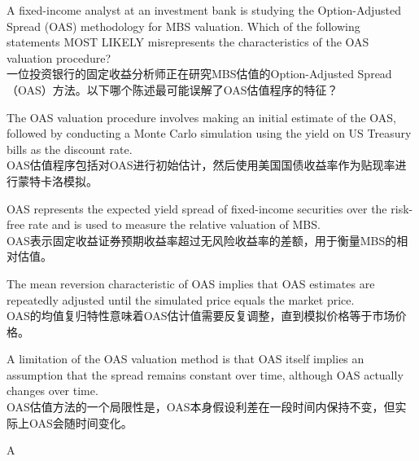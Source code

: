 \documentclass{article}
\newcounter{question} %
\begin{document}
\begin{question}
    A fixed-income analyst at an investment bank is studying the Option-Adjusted Spread (OAS) methodology for MBS valuation. Which of the following statements MOST LIKELY misrepresents the characteristics of  the OAS valuation procedure?\\
    一位投资银行的固定收益分析师正在研究MBS估值的Option-Adjusted Spread（OAS）方法。以下哪个陈述最可能误解了OAS估值程序的特征？
\end{question}

\begin{choices}
    \item The OAS valuation procedure involves making an initial estimate of the OAS, followed by conducting a Monte Carlo simulation using the yield on US Treasury bills as the discount rate.\\
    OAS估值程序包括对OAS进行初始估计，然后使用美国国债收益率作为贴现率进行蒙特卡洛模拟。
    \item OAS represents the expected yield spread of fixed-income securities over the risk-free rate and is used to measure the relative valuation of MBS.\\
    OAS表示固定收益证券预期收益率超过无风险收益率的差额，用于衡量MBS的相对估值。
    \item The mean reversion characteristic of OAS implies that OAS estimates are repeatedly adjusted until the simulated price equals the market price.\\
    OAS的均值复归特性意味着OAS估计值需要反复调整，直到模拟价格等于市场价格。
    \item A limitation of the OAS valuation method is that OAS itself implies an assumption that the spread remains constant over time, although OAS actually changes over time.\\
    OAS估值方法的一个局限性是，OAS本身假设利差在一段时间内保持不变，但实际上OAS会随时间变化。
\end{choices}

\begin{correctanswer}
    A
\end{correctanswer}
\end{document}
